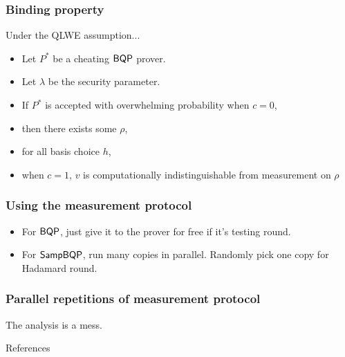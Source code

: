 \documentclass{beamer}
\begin{document}
\begin{frame}
	\frametitle{Binding property}
	Under the QLWE assumption...
	\begin{itemize}[<+->]
		\item Let $P^*$ be a cheating $\operatorname{\mathsf{BQP}}$ prover.
		\item Let $\lambda$ be the security parameter.
		\item If $P^*$ is accepted with overwhelming probability when $c=0$,
		\item then there exists some $\rho$,
		\item for all basis choice $h$,
		\item when $c=1$, $v$ is computationally indistinguishable from measurement on $\rho$
	\end{itemize}
\end{frame}

\begin{frame}
	\frametitle{Using the measurement protocol}
	\begin{itemize}[<+->]
		\item For $\operatorname{\mathsf{BQP}}$, just give it to the prover for free if it's testing round.
		\item For $\operatorname{\mathsf{SampBQP}}$, run many copies in parallel. Randomly pick one copy for Hadamard round.
	\end{itemize}
\end{frame}

\begin{frame}
	\frametitle{Parallel repetitions of measurement protocol}
	The analysis is a mess.
\end{frame}

\begin{frame}{References}
	
	
\end{frame}
\end{document}
